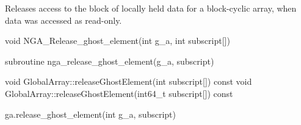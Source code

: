 \documentclass[12pt]{article}
\begin{document}
\begin{desc}

Releases access to the block of locally held data for a block-cyclic array,
when data was accessed as read-only.

\end{desc}



\begin{capi}
\begin{ccode}
void NGA_Release_ghost_element(int g_a, int subscript[])
\end{ccode}
\begin{funcargs}
\end{funcargs}
\end{capi}

\begin{fapi}
\begin{fcode}
subroutine nga_release_ghost_element(g_a, subscript)
\end{fcode}
\begin{funcargs}
\end{funcargs}
\end{fapi}

\begin{cxxapi}
\begin{cxxcode}
void GlobalArray::releaseGhostElement(int subscript[]) const
void GlobalArray::releaseGhostElement(int64_t subscript[]) const
\end{cxxcode}
\begin{funcargs}
\end{funcargs}
\end{cxxapi}

\begin{pyapi}
\begin{pycode}
ga.release_ghost_element(int g_a, subscript)
\end{pycode}
\begin{funcargs}
\end{funcargs}
\end{pyapi}

\local
\end{document}
